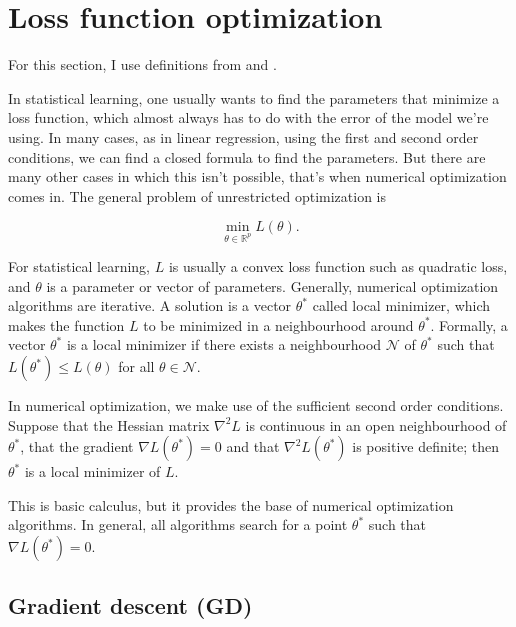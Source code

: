 
\section{Loss function optimization}


For this section, I use definitions from \cite{nocedal2006numerical} and \cite{1606.04838}.


In statistical learning, one usually wants to find the parameters that minimize a loss function, which almost always has to do with the error of the model we're using. In many cases, as in linear regression, using the first and second order conditions, we can find a closed formula to find the parameters. But there are many other cases in which this isn't possible, that's when numerical optimization comes in. 
The general problem of unrestricted optimization is

\begin{equation}
  \min_{\theta \in \mathbb{R}^p} L(\theta).
\end{equation}

For statistical learning, $L$ is usually a convex loss function such as quadratic loss, and $\theta$ is a parameter or vector of parameters. Generally, numerical optimization algorithms are iterative. A solution is a vector $\theta^*$ called local minimizer, which makes the function $L$ to be minimized in a neighbourhood around $\theta^*$. Formally, a vector $\theta^*$ is a local minimizer if there exists a neighbourhood $\mathcal{N}$ of $\theta^*$ such that $L(\theta^*) \leq L(\theta)$ for all $\theta \in \mathcal{N}$.

In numerical optimization, we make use of the sufficient second order conditions. Suppose that the Hessian matrix $\nabla^2 L$ is continuous in an open neighbourhood of $\theta^*$, that the gradient $\nabla L(\theta^*) = 0$ and that $\nabla^2 L(\theta^*)$ is positive definite; then $\theta^*$ is a local minimizer of $L$.

This is basic calculus, but it provides the base of numerical optimization algorithms. In general, all algorithms search for a point $\theta^*$ such that $\nabla L(\theta^*) = 0$. 



\subsection{Gradient descent (GD)}

